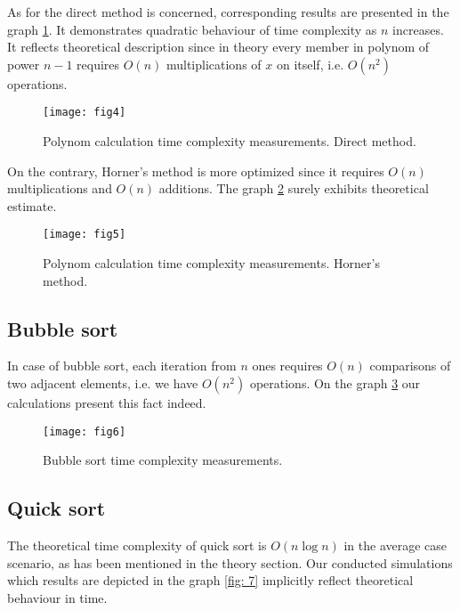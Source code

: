 \documentclass[12pt, bachelor, substylefile = algo_title.rtx]{disser}
\theoremstyle{definition}
\begin{document}
As for the direct method is concerned, corresponding results are presented in the graph \ref{fig: 4}. It demonstrates quadratic behaviour of time complexity as $n$ increases. It reflects theoretical description since in theory every member in polynom of power $n-1$ requires $O(n)$ multiplications of $x$ on itself, i.e. $O(n^2)$ operations.

\begin{figure}[h]
\begin{center}
\texttt{[image: fig4]}
\caption{Polynom calculation time complexity measurements. Direct method.}
\label{fig: 4}
\end{center}
\end{figure}

On the contrary, Horner's method is more optimized since it requires $O(n)$ multiplications and $O(n)$ additions. The graph \ref{fig: 5} surely exhibits theoretical estimate.

\begin{figure}[h]
\begin{center}
\texttt{[image: fig5]}
\caption{Polynom calculation time complexity measurements. Horner's method.}
\label{fig: 5}
\end{center}
\end{figure}

\subsection{Bubble sort}
In case of bubble sort, each iteration from $n$ ones requires $O(n)$ comparisons of two adjacent elements, i.e. we have $O(n^2)$ operations. On the graph \ref{fig: 6} our calculations present this fact indeed.

\begin{figure}[h]
\begin{center}
\texttt{[image: fig6]}
\caption{Bubble sort time complexity measurements.}
\label{fig: 6}
\end{center}
\end{figure}

\subsection{Quick sort}

The theoretical time complexity of quick sort is $O(n \log n)$ in the average case scenario, as has been mentioned in the theory section. Our conducted simulations which results are depicted in the graph \ref{fig: 7} implicitly reflect theoretical behaviour in time.
\end{document}
